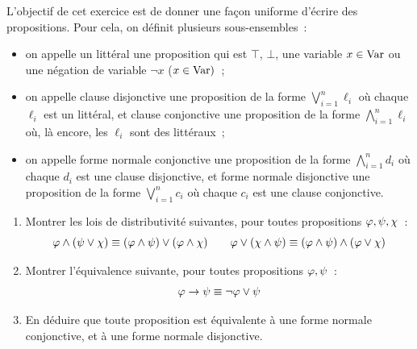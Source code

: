 \begin{exercise}
  L'objectif de cet exercice est de donner une façon uniforme d'écrire des
  propositions. Pour cela, on définit plusieurs sous-ensembles~:
  \begin{itemize}
  \item on appelle un littéral une proposition qui est $\top$, $\bot$, une
    variable $x \in \operatorname{Var}$ ou une négation de variable $\lnot x$ ($x \in \operatorname{Var})$~;
  \item on appelle clause disjonctive une proposition de la forme
    $\displaystyle\bigvee_{i = 1}^n \ell_i$
    où chaque $\ell_i$ est un littéral, et clause conjonctive une proposition
    de la forme
    $\displaystyle\bigwedge_{i = 1}^n \ell_i$
    où, là encore, les $\ell_i$ sont des littéraux~;
  \item on appelle forme normale conjonctive une proposition de la forme
    $\displaystyle\bigwedge_{i = 1}^n d_i$
    où chaque $d_i$ est une clause disjonctive, et forme normale disjonctive
    une proposition de la forme
    $\displaystyle\bigvee_{i = 1}^n c_i$
    où chaque $c_i$ est une clause conjonctive.
  \end{itemize}
  \begin{enumerate}[label=(\roman*)]
  \item Montrer les lois de distributivité suivantes, pour toutes propositions
    $\varphi,\psi,\chi$~:
    \[\varphi\land (\psi\lor \chi) \equiv
    (\varphi\land \psi) \lor (\varphi\land \chi) \qquad
    \varphi\lor (\chi \land \psi) \equiv
    (\varphi\land \psi) \land (\varphi\lor \chi)\]
  \item Montrer l'équivalence suivante, pour toutes propositions
    $\varphi,\psi$~:
    \[\varphi \to \psi \equiv \lnot \varphi \lor \psi\]
  \item En déduire que toute proposition est équivalente à une forme normale
    conjonctive, et à une forme normale disjonctive.
  \end{enumerate}
\end{exercise}

